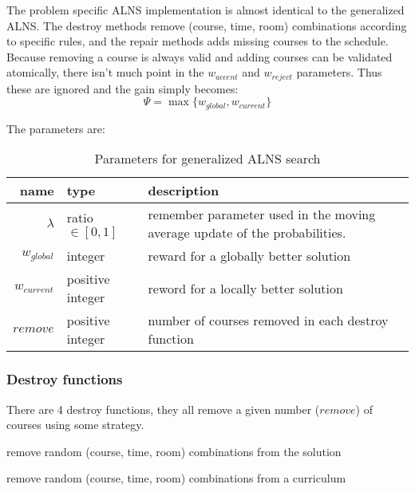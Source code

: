 The problem specific ALNS implementation is almost identical to the generalized ALNS. The destroy methods remove (course, time, room) combinations according to specific rules, and the repair methods adds missing courses to the schedule. Because removing a course is always valid and adding courses can be validated atomically, there isn't much point in the $w_{accent}$ and $w_{reject}$ parameters. Thus these are ignored and the gain simply becomes:
\begin{equation}
\Psi = \max\{w_{global}, w_{current}\}
\end{equation}

The parameters are:

\begin{table}[H]
\centering
\begin{tabular}{r|p{2.5cm}|p{6cm}}
	name & type & description \\ \hline
	$\lambda$ & ratio $\in [0, 1]$ & remember parameter used in the moving average update of the probabilities. \\
	$w_{global}$ & integer & reward for a globally better solution \\
	$w_{current}$ & positive integer & reword for a locally better solution \\
	$remove$ & positive integer & number of courses removed in each destroy function
\end{tabular}
\caption{Parameters for generalized ALNS search}
\end{table}

\subsubsection{Destroy functions}

There are 4 destroy functions, they all remove a given number ($remove$) of courses using some strategy.

\begin{algorithm}[H]
  \caption{remove random (course, time, room) combinations from the solution}
  \begin{algorithmic}[1]
        \State {}
      \EndFor
    \EndFunction
  \end{algorithmic}
\end{algorithm}

\begin{algorithm}[H]
  \caption{remove random (course, time, room) combinations from a curriculum}
  \begin{algorithmic}[1]
        \State {}
      \EndFor
    \EndFunction
  \end{algorithmic}
\end{algorithm}

